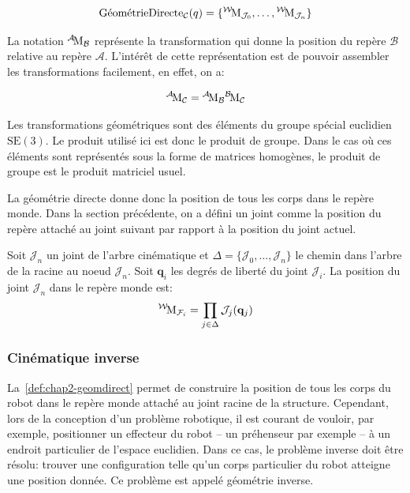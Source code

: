 \begin{equation}
  \text{GéométrieDirecte}_{\mathcal{C}}(q) = \{
  {}^{\mathcal{W}}\!\text{M}_{\mathcal{J}_0}, \dotsc,
  {}^{\mathcal{W}}\!\text{M}_{\mathcal{J}_n} \}
\end{equation}

La notation ${}^{\mathcal{A}}\!\text{M}_{\mathcal{B}}$ représente la
transformation qui donne la position du repère $\mathcal{B}$ relative
au repère $\mathcal{A}$. L'intérêt de cette représentation est de
pouvoir assembler les transformations facilement, en effet, on a:

\begin{equation}
  {}^{\mathcal{A}}\!\text{M}_{\mathcal{C}} = {}^{\mathcal{A}}\!\text{M}_{\mathcal{B}} {}^{\mathcal{B}}\!\text{M}_{\mathcal{C}}
\end{equation}

Les transformations géométriques sont des éléments du groupe spécial
euclidien $\text{SE}(3)$. Le produit utilisé ici est donc le produit
de groupe. Dans le cas où ces éléments sont représentés sous la forme
de matrices homogènes, le produit de groupe est le produit matriciel
usuel.


La géométrie directe donne donc la position de tous les corps dans le
repère monde. Dans la section précédente, on a défini un joint comme
la position du repère attaché au joint suivant par rapport à la
position du joint actuel.

\begin{mydef}\label{def:chap2-geomdirect}
Soit $\mathcal{J}_n$ un joint de l'arbre cinématique et $\Delta =
\{\mathcal{J}_0, \dotsc, \mathcal{J}_n\}$ le chemin dans l'arbre de la
racine au noeud $\mathcal{J}_n$. Soit $\mathbf{q}_i$ les degrés de
liberté du joint $\mathcal{J}_i$. La position du joint $\mathcal{J}_n$
dans le repère monde est:
\begin{equation}
  {}^{\mathcal{W}}\!\text{M}_{\mathcal{F}_i} = \prod_{j \in \Delta} \mathcal{J}_j (\mathbf{q}_j)
\end{equation}
\end{mydef}


\subsubsection{Cinématique inverse}

La \autoref{def:chap2-geomdirect} permet de construire la position de
tous les corps du robot dans le repère monde attaché au joint racine
de la structure. Cependant, lors de la conception d'un problème
robotique, il est courant de vouloir, par exemple, positionner un
effecteur du robot -- un préhenseur par exemple -- à un endroit
particulier de l'espace euclidien. Dans ce cas, le problème inverse
doit être résolu: trouver une configuration telle qu'un corps
particulier du robot atteigne une position donnée. Ce problème est
appelé géométrie inverse.



